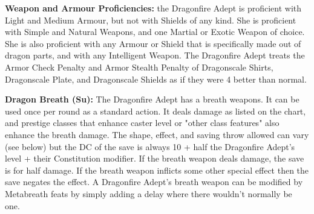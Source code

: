 \modebab{}
\goodfor{}
\goodref{}
\goodwil{}

\begin{extraclasstable}{}
\end{extraclasstable}

\classfeatures

\textbf{Weapon and Armour Proficiencies:} the Dragonfire Adept is proficient with Light and Medium Armour, but not with Shields of any kind. She is proficient with Simple and Natural Weapons, and one Martial or Exotic Weapon of choice. She is also proficient with any Armour or Shield that is specifically made out of dragon parts, and with any Intelligent Weapon. The Dragonfire Adept treats the Armor Check Penalty and Armor Stealth Penalty of Dragonscale Shirts, Dragonscale Plate, and Dragonscale Shields as if they were 4 better than normal.

\textbf{Dragon Breath (Su):} The Dragonfire Adept has a breath weapons. It can be used once per round as a standard action. It deals damage as listed on the chart, and prestige classes that enhance caster level or "other class features" also enhance the breath damage. The shape, effect, and saving throw allowed can vary (see below) but the DC of the save is always 10 + half the Dragonfire Adept's level + their Constitution modifier. If the breath weapon deals damage, the save is for half damage. If the breath weapon inflicts some other special effect then the save negates the effect. A Dragonfire Adept's breath weapon can be modified by Metabreath feats by simply adding a delay where there wouldn't normally be one.

